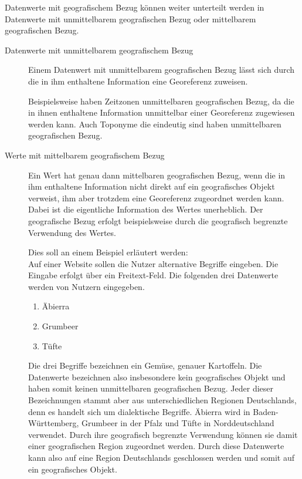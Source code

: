 			Datenwerte mit geografischem Bezug können weiter unterteilt werden in Datenwerte mit unmittelbarem geografischen Bezug oder mittelbarem geografischen Bezug. 

			\begin{description}
				\item[Datenwerte mit unmittelbarem geografischem Bezug]

					Einem Datenwert mit unmittelbarem geografischen Bezug lässt sich durch die in ihm enthaltene Information eine Georeferenz zuweisen.	

					Beispielsweise haben Zeitzonen unmittelbaren geografischen Bezug, da die in ihnen enthaltene Information unmittelbar einer Georeferenz zugewiesen werden kann.
					Auch Toponyme die eindeutig sind haben unmittelbaren geografischen Bezug.

				\item[Werte mit mittelbarem geografischem Bezug] 

					Ein Wert hat genau dann mittelbaren geografischen Bezug, wenn die in ihm enthaltene Information nicht direkt auf ein geografisches Objekt verweist, ihm aber trotzdem eine Georeferenz zugeordnet werden kann.
					Dabei ist die eigentliche Information des Wertes unerheblich. 
					Der geografische Bezug erfolgt beispielsweise durch die geografisch begrenzte Verwendung des Wertes. 

					Dies soll an einem Beispiel erläutert werden:\\
					Auf einer Website sollen die Nutzer alternative Begriffe eingeben.
					Die Eingabe erfolgt über ein Freitext-Feld. 
					Die folgenden drei Datenwerte werden von Nutzern eingegeben.

					\begin{enumerate}
					 	\item Äbierra
					 	\item Grumbeer
					 	\item Tüfte 
					 \end{enumerate} 

					Die drei Begriffe bezeichnen ein Gemüse, genauer Kartoffeln.
					Die Datenwerte bezeichnen also insbesondere kein geografisches Objekt und haben somit keinen unmittelbaren geografischen Bezug.
					Jeder dieser Bezeichnungen stammt aber aus unterschiedlichen Regionen Deutschlands, denn es handelt sich um dialektische Begriffe.
					Äbierra wird in Baden-Württemberg, Grumbeer in der Pfalz und Tüfte in Norddeutschland verwendet.
					Durch ihre geografisch begrenzte Verwendung können sie damit einer geografischen Region zugeordnet werden.
					Durch diese Datenwerte kann also auf eine Region Deutschlands geschlossen werden und somit auf ein geografisches Objekt.

			\end{description}

